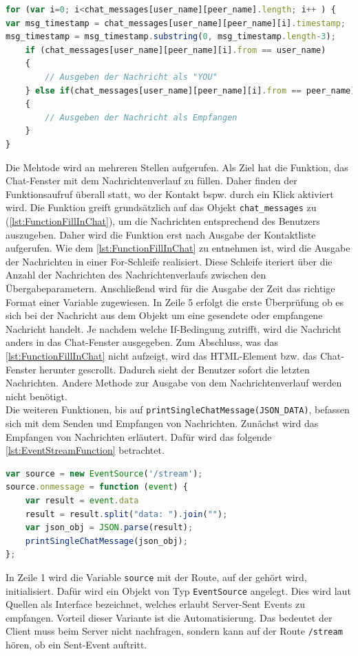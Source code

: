 \documentclass[a4paper,titlepage,halfparskip,12pt]{scrreprt}
\begin{document}
\begin{onehalfspacing}
\begin{lstlisting}[language=Javascript,caption=Ausschnitt aus der Funktion \texttt{pull\_chat\_hisotry(username)} ,label={lst:FunctionFillInChat}]
for (var i=0; i<chat_messages[user_name][peer_name].length; i++ ) {
var msg_timestamp = chat_messages[user_name][peer_name][i].timestamp;
msg_timestamp = msg_timestamp.substring(0, msg_timestamp.length-3);
	if (chat_messages[user_name][peer_name][i].from == user_name)
	{
		// Ausgeben der Nachricht als "YOU"	
	} else if(chat_messages[user_name][peer_name][i].from == peer_name)
	{	
		// Ausgeben der Nachricht als Empfangen
	}
}
\end{lstlisting}
Die Mehtode wird an mehreren Stellen aufgerufen. Als Ziel hat die Funktion, das Chat-Fenster mit dem Nachrichtenverlauf zu füllen. Daher finden der Funktionsaufruf überall statt, wo der Kontakt bspw. durch ein Klick aktiviert wird. Die Funktion greift grundsätzlich auf das Objekt \texttt{chat\_messages} zu (\autoref{lst:FunctionFillInChat}), um die Nachrichten entsprechend des Benutzers auszugeben. Daher wird die Funktion erst nach Ausgabe der Kontaktliste aufgerufen. Wie dem \autoref{lst:FunctionFillInChat} zu entnehmen ist, wird die Ausgabe der Nachrichten in einer For-Schleife realisiert. Diese Schleife iteriert über die Anzahl der Nachrichten des Nachrichtenverlaufs zwischen den Übergabeparametern. Anschließend wird für die Ausgabe der Zeit das richtige Format einer Variable zugewiesen. In Zeile 5 erfolgt die erste Überprüfung ob es sich bei der Nachricht aus dem Objekt um eine gesendete oder empfangene Nachricht handelt. Je nachdem welche If-Bedingung zutrifft, wird die Nachricht anders in das Chat-Fenster ausgegeben. Zum Abschluss, was das \autoref{lst:FunctionFillInChat} nicht aufzeigt, wird das \ac{HTML}-Element bzw. das Chat-Fenster herunter gescrollt. Dadurch sieht der Benutzer sofort die letzten Nachrichten. Andere Methode zur Ausgabe von dem Nachrichtenverlauf werden nicht benötigt.\\
Die weiteren Funktionen, bis auf \texttt{printSingleChatMessage(JSON\_DATA)}, befassen sich mit dem Senden und Empfangen von Nachrichten. Zunächst wird das Empfangen von Nachrichten erläutert. Dafür wird das folgende \autoref{lst:EventStreamFunction} betrachtet.
\begin{lstlisting}[language=Javascript,caption=Öffnen des Eventstreams um Nachrichten zu empfangen ,label={lst:EventStreamFunction}]
var source = new EventSource('/stream');
source.onmessage = function (event) {
	var result = event.data
	result = result.split("data: ").join("");
	var json_obj = JSON.parse(result);
	printSingleChatMessage(json_obj);
};
\end{lstlisting}
In Zeile 1 wird die Variable \texttt{source} mit der Route, auf der gehört wird, initialisiert. Dafür wird ein Objekt von Typ \texttt{EventSource} angelegt. Dies wird laut Quellen als Interface bezeichnet, welches erlaubt Server-Sent Events zu empfangen. Vorteil dieser Variante ist die Automatisierung. Das bedeutet der Client muss beim Server nicht nachfragen, sondern kann auf der Route \texttt{/stream} hören, ob ein Sent-Event auftritt.\cite{w3schoolsServerSentEvent}\\

\end{onehalfspacing}
\end{document}
